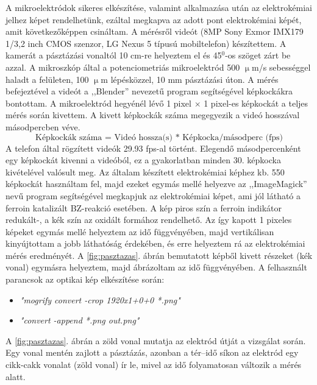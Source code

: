 A mikroelektródok sikeres elkészítése, valamint alkalmazása után az elektrokémiai jelhez képet rendelhetünk, ezáltal megkapva az adott pont elektrokémiai képét, amit következőképpen csináltam. A mérésről videót (8MP Sony Exmor IMX179 1/3,2 inch CMOS szenzor, LG Nexus 5 típusú mobiltelefon) készítettem. A kamerát a pásztázási vonaltól 10 cm-re helyeztem el és 45$^0$-os szöget zárt be azzal. A mikroszkóp által a potenciometriás mikroelektród 500 $\upmu$m/s sebességgel haladt a felületen, 100 $\upmu$m lépésközzel, 10 mm pásztázási úton. A mérés befejeztével a videót a ,,Blender'' \cite{blender1} nevezetű program segítségével képkockákra bontottam. A mikroelektród hegyénél lévő 1 pixel $\times$ 1 pixel-es képkockát a teljes mérés során kivettem. A kivett képkockák száma megegyezik a videó hosszával másodpercben véve.
\begin{equation} 
\textrm{Képkockák száma = Videó hossza(s) * Képkocka/másodperc (fps)}
\end{equation}
A telefon által rögzített videók 29.93 fps-al történt. Elegendő másodpercenként egy képkockát kivenni a videóból, ez a gyakorlatban minden 30. képkocka kivételével valósult meg. Az általam készített elektrokémiai képhez kb. 550 képkockát használtam fel, majd ezeket egymás mellé helyezve az ,,ImageMagick'' \cite{imagemagick} nevű program segítségével megkapjuk az elektrokémiai képet, ami jól látható a ferroin katalizált BZ-reakció esetében. A kép piros szín a ferroin indikátor redukált-, a kék szín az oxidált formához rendelhető. Az így kapott 1 pixeles képeket egymás mellé helyeztem az idő függvényében, majd vertikálisan kinyújtottam a jobb láthatóság érdekében, és erre helyeztem rá az elektrokémiai mérés eredményét.
A \ref{fig:pasztazas}. ábrán bemutatott képből kivett részeket (kék vonal) egymásra helyeztem, majd ábrázoltam az idő függvényében.
A felhasznált parancsok az optikai kép elkészítése során:
\begin{itemize}
\item \emph{"mogrify convert -crop 1920x1+0+0 *.png"}
\item \emph{"convert -append *.png out.png"}
\end{itemize}
 A \ref{fig:pasztazas}. ábrán a zöld vonal mutatja az elektród útját a vizsgálat során. Egy vonal mentén zajlott a pásztázás, azonban a tér--idő síkon az elektród egy cikk-cakk vonalat (zöld vonal) ír le, mivel az idő folyamatosan változik a mérés alatt.
